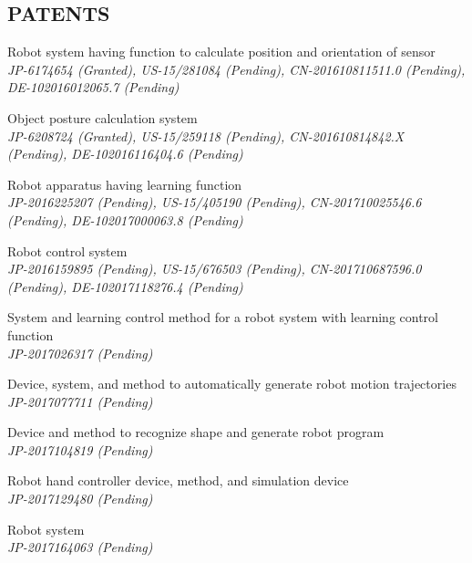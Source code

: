\documentclass[UTF8,nofonts]{res}
\begin{document}
\begin{resume}
\section{PATENTS}
\begin{etaremune}
	\item Robot system having function to calculate position and orientation of sensor {\it \\JP-6174654 (Granted), US-15/281084 (Pending), CN-201610811511.0 (Pending), DE-102016012065.7 (Pending)}
	\item Object posture calculation system {\it \\JP-6208724 (Granted), US-15/259118 (Pending), CN-201610814842.X (Pending), DE-102016116404.6 (Pending)}
	\item Robot apparatus having learning function {\it \\JP-2016225207 (Pending), US-15/405190 (Pending), CN-201710025546.6 (Pending), DE-102017000063.8 (Pending)}
	\item Robot control system {\it \\JP-2016159895 (Pending), US-15/676503 (Pending), CN-201710687596.0 (Pending), DE-102017118276.4 (Pending)}
	\item System and learning control method for a robot system with learning control function {\it \\JP-2017026317 (Pending)}
	\item Device, system, and method to automatically generate robot motion trajectories {\it \\JP-2017077711 (Pending)}
	\item Device and method to recognize shape and generate robot program {\it \\JP-2017104819 (Pending)}
	\item Robot hand controller device, method, and simulation device {\it \\JP-2017129480 (Pending)}
	\item Robot system {\it \\JP-2017164063 (Pending)}
\end{etaremune}


\end{resume}
\end{document}
